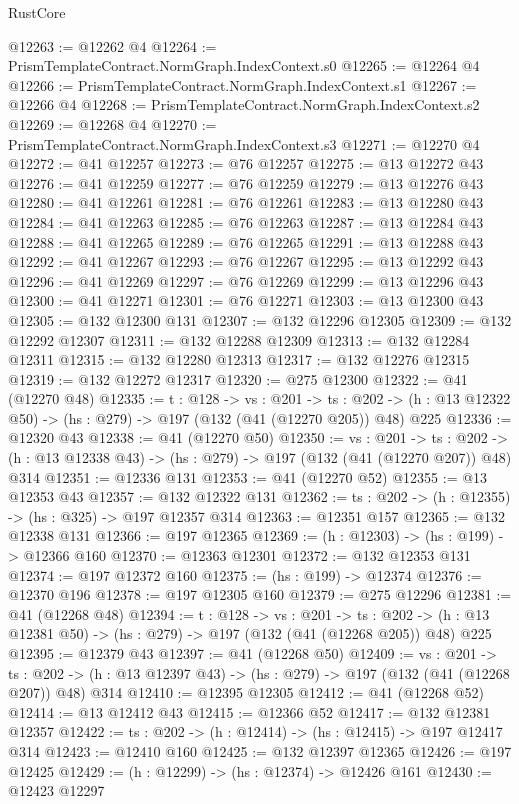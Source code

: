 \begin{lexlean}{RustCore}
\begin{coremodule}
@12263 := @12262 @4
@12264 := PrismTemplateContract.NormGraph.IndexContext.s0
@12265 := @12264 @4
@12266 := PrismTemplateContract.NormGraph.IndexContext.s1
@12267 := @12266 @4
@12268 := PrismTemplateContract.NormGraph.IndexContext.s2
@12269 := @12268 @4
@12270 := PrismTemplateContract.NormGraph.IndexContext.s3
@12271 := @12270 @4
@12272 := @41 @12257
@12273 := @76 @12257
@12275 := @13 @12272 @43
@12276 := @41 @12259
@12277 := @76 @12259
@12279 := @13 @12276 @43
@12280 := @41 @12261
@12281 := @76 @12261
@12283 := @13 @12280 @43
@12284 := @41 @12263
@12285 := @76 @12263
@12287 := @13 @12284 @43
@12288 := @41 @12265
@12289 := @76 @12265
@12291 := @13 @12288 @43
@12292 := @41 @12267
@12293 := @76 @12267
@12295 := @13 @12292 @43
@12296 := @41 @12269
@12297 := @76 @12269
@12299 := @13 @12296 @43
@12300 := @41 @12271
@12301 := @76 @12271
@12303 := @13 @12300 @43
@12305 := @132 @12300 @131
@12307 := @132 @12296 @12305
@12309 := @132 @12292 @12307
@12311 := @132 @12288 @12309
@12313 := @132 @12284 @12311
@12315 := @132 @12280 @12313
@12317 := @132 @12276 @12315
@12319 := @132 @12272 @12317
@12320 := @275 @12300
@12322 := @41 (@12270 @48)
@12335 := {t : @128} ->
  {vs : @201} ->
  {ts : @202} -> (h : @13 @12322 @50) -> (hs : @279) -> @197 (@132 (@41 (@12270 @205)) @48) @225
@12336 := @12320 @43
@12338 := @41 (@12270 @50)
@12350 := {vs : @201} ->
  {ts : @202} -> (h : @13 @12338 @43) -> (hs : @279) -> @197 (@132 (@41 (@12270 @207)) @48) @314
@12351 := @12336 @131
@12353 := @41 (@12270 @52)
@12355 := @13 @12353 @43
@12357 := @132 @12322 @131
@12362 := {ts : @202} -> (h : @12355) -> (hs : @325) -> @197 @12357 @314
@12363 := @12351 @157
@12365 := @132 @12338 @131
@12366 := @197 @12365
@12369 := (h : @12303) -> (hs : @199) -> @12366 @160
@12370 := @12363 @12301
@12372 := @132 @12353 @131
@12374 := @197 @12372 @160
@12375 := (hs : @199) -> @12374
@12376 := @12370 @196
@12378 := @197 @12305 @160
@12379 := @275 @12296
@12381 := @41 (@12268 @48)
@12394 := {t : @128} ->
  {vs : @201} ->
  {ts : @202} -> (h : @13 @12381 @50) -> (hs : @279) -> @197 (@132 (@41 (@12268 @205)) @48) @225
@12395 := @12379 @43
@12397 := @41 (@12268 @50)
@12409 := {vs : @201} ->
  {ts : @202} -> (h : @13 @12397 @43) -> (hs : @279) -> @197 (@132 (@41 (@12268 @207)) @48) @314
@12410 := @12395 @12305
@12412 := @41 (@12268 @52)
@12414 := @13 @12412 @43
@12415 := @12366 @52
@12417 := @132 @12381 @12357
@12422 := {ts : @202} -> (h : @12414) -> (hs : @12415) -> @197 @12417 @314
@12423 := @12410 @160
@12425 := @132 @12397 @12365
@12426 := @197 @12425
@12429 := (h : @12299) -> (hs : @12374) -> @12426 @161
@12430 := @12423 @12297

\end{coremodule}
\end{lexlean}
